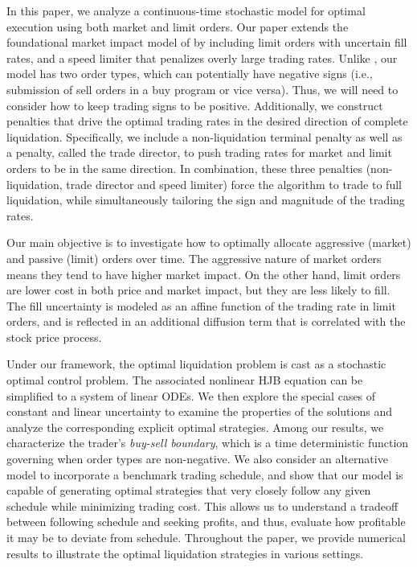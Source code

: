\documentclass[12pt, letterpaper]{article}
\numberwithin{equation}{section}
\numberwithin{theorem}{section}
\begin{document}
In this paper, we  analyze a continuous-time stochastic model for optimal execution using both  market and limit orders. Our paper extends the foundational market impact model of \cite{AC2000} by including limit orders with uncertain fill rates, and a speed limiter that penalizes overly large trading rates. Unlike \cite{AC2000}, our model has two order types, which can potentially have negative signs (i.e., submission of sell orders in a buy program or vice versa). Thus, we will need to consider how to keep trading signs to be positive. Additionally, we construct penalties that drive the optimal trading rates in the desired direction of complete liquidation. Specifically, we include a non-liquidation terminal penalty as well as a penalty, called the trade director, to push trading rates for market and limit orders to be in the same direction. In combination, these three penalties (non-liquidation, trade director and speed limiter) force the algorithm to trade to full liquidation, while simultaneously tailoring the sign and magnitude of the trading rates.  

Our main objective is to investigate how to optimally allocate aggressive (market) and passive (limit) orders over time. The aggressive nature of market orders means they tend to have higher market impact. On the other hand, limit orders are lower cost in both price and market impact, but they are less likely to fill.  The  fill uncertainty is modeled  as an affine function of the trading rate in limit orders, and is reflected in an additional diffusion term that is correlated with the stock price process.

Under our framework, the optimal liquidation problem is cast as a stochastic optimal control problem. The associated nonlinear HJB equation can be simplified to a system of linear ODEs. We then explore the special cases of constant and linear uncertainty to examine the properties of the solutions and analyze the corresponding explicit optimal strategies. Among our results, we characterize the trader's \textit{buy-sell boundary}, which is a time deterministic function governing when order types are non-negative. We also consider an alternative model to incorporate a  benchmark trading schedule, and  show that our model is capable of generating optimal strategies that very closely follow any given schedule while minimizing trading cost. This allows us to understand a tradeoff between following schedule and seeking profits, and thus, evaluate how profitable it may be to deviate from schedule. Throughout the paper, we provide numerical results to illustrate the optimal liquidation strategies in various settings. 
\end{document}
